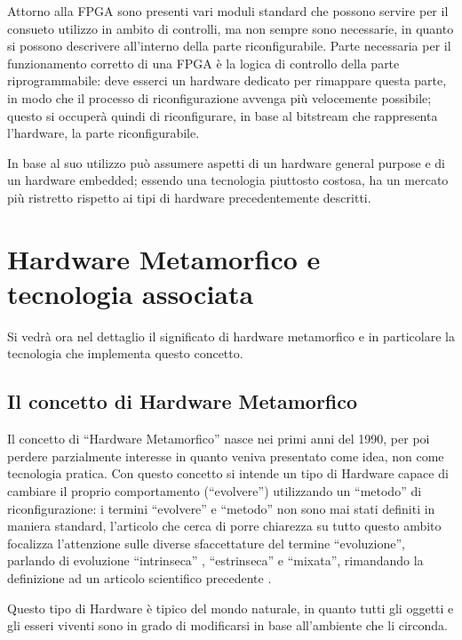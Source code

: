 \documentclass[a4paper,titlepage]{book}
\begin{document}
Attorno alla FPGA sono presenti vari moduli standard che possono servire per il consueto utilizzo in ambito di controlli, ma non sempre sono necessarie, in quanto si possono descrivere all'interno della parte riconfigurabile. Parte necessaria per il funzionamento corretto di una FPGA è la logica di controllo della parte riprogrammabile: deve esserci un hardware dedicato per rimappare questa parte, in modo che il processo di riconfigurazione avvenga più velocemente possibile; questo si occuperà quindi di riconfigurare, in base al bitstream che rappresenta l'hardware, la parte riconfigurabile.

In base al suo utilizzo può assumere aspetti di un hardware general purpose e di un hardware embedded; essendo una tecnologia piuttosto costosa, ha un mercato più ristretto rispetto ai tipi di hardware precedentemente descritti.

\section{Hardware Metamorfico e tecnologia associata}

Si vedrà ora nel dettaglio il significato di hardware metamorfico e in particolare la tecnologia che implementa questo concetto. 

\subsection{Il concetto di Hardware Metamorfico}

Il concetto di ``Hardware Metamorfico'' nasce nei primi anni del 1990, per poi perdere parzialmente interesse in quanto veniva presentato come idea, non come tecnologia pratica. Con questo concetto si intende un tipo di Hardware capace di cambiare il proprio comportamento (``evolvere'') utilizzando un ``metodo'' di riconfigurazione: i termini ``evolvere'' e ``metodo'' non sono mai stati definiti in maniera standard, l'articolo che cerca di porre chiarezza su tutto questo ambito \cite{MS1} focalizza l'attenzione sulle diverse sfaccettature del termine ``evoluzione'', parlando di evoluzione ``intrinseca'' , ``estrinseca'' e ``mixata'', rimandando la definizione ad un articolo scientifico precedente \cite{EIE}.

Questo tipo di Hardware è tipico del mondo naturale, in quanto tutti gli oggetti e gli esseri viventi sono in grado di modificarsi in base all'ambiente che li circonda.
\end{document}
